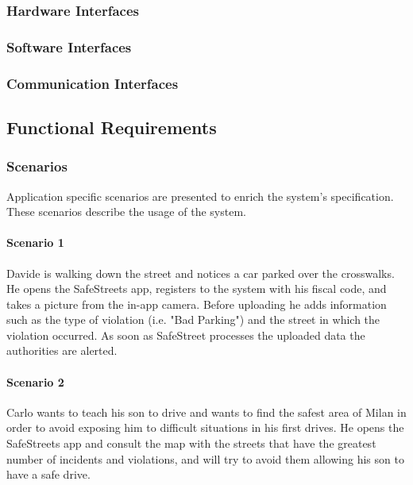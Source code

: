 \clearpage

\subsubsection{Hardware Interfaces}
	
\subsubsection{Software Interfaces}
\subsubsection{Communication Interfaces}

\clearpage

\subsection{Functional Requirements}

\subsubsection{Scenarios}

Application specific scenarios are presented to enrich the system's specification. These scenarios describe the usage of the system.

\paragraph{Scenario 1}
\label{scenario:1}
	Davide is walking down the street and notices a car parked over the crosswalks. He opens the SafeStreets app, registers to the system with his fiscal code, and takes a picture from the in-app camera. Before uploading he adds information such as the type of violation (i.e. "Bad Parking") and the street in which the violation occurred. As soon as SafeStreet processes the uploaded data the authorities are alerted.

\paragraph{Scenario 2}
\label{scenario:2}
	Carlo wants to teach his son to drive and wants to find the safest area of Milan in order to avoid exposing him to difficult situations in his first drives. He opens the SafeStreets app and consult the map with the streets that have the greatest number of incidents and violations, and will try to avoid them allowing his son to have a safe drive.

